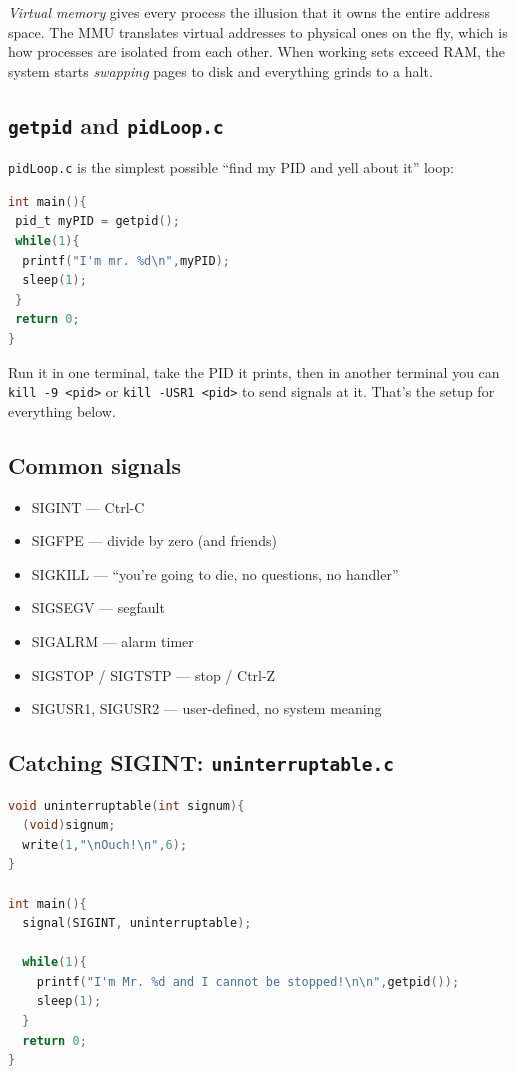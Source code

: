 \documentclass[11pt]{article}
\begin{document}
\emph{Virtual memory} gives every process the illusion that it owns
the entire address space. The MMU translates virtual addresses to
physical ones on the fly, which is how processes are isolated from
each other. When working sets exceed RAM, the system starts
\emph{swapping} pages to disk and everything grinds to a halt.

\subsection*{\texttt{getpid} and \texttt{pidLoop.c}}

\texttt{pidLoop.c} is the simplest possible ``find my PID and yell
about it'' loop:

\begin{lstlisting}[language=C]
int main(){
 pid_t myPID = getpid();
 while(1){
  printf("I'm mr. %d\n",myPID);
  sleep(1);
 }
 return 0;
}
\end{lstlisting}

Run it in one terminal, take the PID it prints, then in another
terminal you can \texttt{kill -9 <pid>} or \texttt{kill -USR1 <pid>}
to send signals at it. That's the setup for everything below.

\subsection*{Common signals}

\begin{itemize}
  \item SIGINT --- Ctrl-C
  \item SIGFPE --- divide by zero (and friends)
  \item SIGKILL --- ``you're going to die, no questions, no handler''
  \item SIGSEGV --- segfault
  \item SIGALRM --- alarm timer
  \item SIGSTOP / SIGTSTP --- stop / Ctrl-Z
  \item SIGUSR1, SIGUSR2 --- user-defined, no system meaning
\end{itemize}

\subsection*{Catching SIGINT: \texttt{uninterruptable.c}}

\begin{lstlisting}[language=C]
void uninterruptable(int signum){
  (void)signum;
  write(1,"\nOuch!\n",6);
}

int main(){
  signal(SIGINT, uninterruptable);

  while(1){
    printf("I'm Mr. %d and I cannot be stopped!\n\n",getpid());
    sleep(1);
  }
  return 0;
}
\end{lstlisting}
\end{document}
